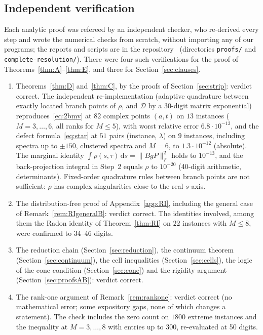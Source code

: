 \documentclass[11pt]{amsart}
\theoremstyle{definition}
\theoremstyle{remark}
\numberwithin{equation}{section}
\newcommand{\cD}{\mathcal{D}}
\newcommand{\dd}{\,\mathrm{d}}
\begin{document}
\subsection{Independent verification}\label{subsec:independent}
Each analytic proof was refereed by an independent checker, who re-derived every step and wrote the numerical checks
from scratch, without importing any of our programs; the reports and scripts are in the repository~\cite{repo-oqp27}
(directories \texttt{proofs/} and \texttt{complete-resolution/}). There were four such verifications for the proof of
Theorems~\ref{thm:A}--\ref{thm:E}, and three for Section~\ref{sec:clauses}.
\begin{enumerate}
\item Theorems~\ref{thm:D} and~\ref{thm:C}, by the proofs of Section~\ref{sec:strip}: verdict correct. The independent
re-implementation (adaptive quadrature between exactly located branch points of $\rho$, and $\cD$ by a 30-digit matrix
exponential) reproduces~\eqref{eq:2bmv} at $82$ complex points $(a,t)$ on $13$ instances ($M=3,\dots,6$, all ranks for
$M\le5$), with worst relative error $6.8\cdot10^{-13}$, and the defect formula~\eqref{eq:star} at $51$ pairs (instance,
$\lambda$) on $9$ instances, including spectra up to $\pm150$, clustered spectra and $M=6$, to $1.3\cdot10^{-12}$
(absolute). The marginal identity $\int\rho(s,\tau)\dd s=\|BgP\|_F^2$ holds to $10^{-13}$, and the back-projection
integral in Step~2 equals $\rho$ to $10^{-20}$ (40-digit arithmetic, determinants). Fixed-order quadrature rules between
branch points are not sufficient: $\rho$ has complex singularities close to the real $s$-axis.
\item The distribution-free proof of Appendix~\ref{app:RI}, including the general case of
Remark~\ref{rem:RIgeneralB}: verdict correct. The identities involved, among them the Radon identity of
Theorem~\ref{thm:RI} on $22$ instances with $M\le8$, were confirmed to 34--46 digits.
\item The reduction chain (Section~\ref{sec:reduction}), the continuum theorem (Section~\ref{sec:continuum}), the cell
inequalities (Section~\ref{sec:cells}), the logic of the cone condition (Section~\ref{sec:cone}) and the rigidity argument
(Section~\ref{sec:proofsAB}): verdict correct.
\item The rank-one argument of Remark~\ref{rem:rankone}: verdict correct (no mathematical error; some expository gaps,
none of which changes a statement). The check includes the zero count on $1800$
extreme instances and the inequality at $M=3,\dots,8$ with entries up to $300$, re-evaluated at 50 digits.

\end{enumerate}
\end{document}

